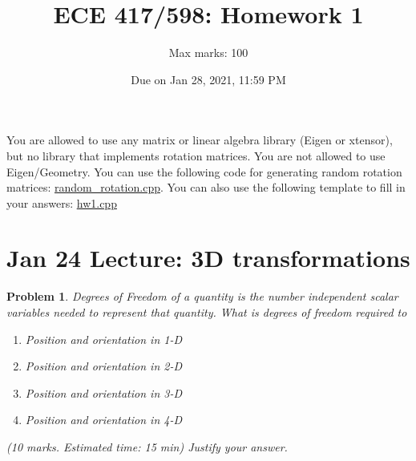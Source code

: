 \documentclass[twocolumn]{article}
\title{ECE 417/598: Homework 1}
\author{Max marks: 100}
\date{Due on Jan 28, 2021, 11:59 PM}
\newtheorem{prob}{Problem}
\newif\ifsol
\begin{document}
\maketitle

You are allowed to use any matrix or linear algebra library (Eigen or xtensor), but no
library that implements rotation matrices. You are not allowed to use
Eigen/Geometry. You can use the following code for generating random rotation matrices:
\href{https://github.com/wecacuee/ECE417-Mobile-Robots/blob/master/notebooks/random_rotation.cpp}{random\_rotation.cpp}.
You can also use the following template to fill in your answers: \href{https://vikasdhiman.info/ECE417-Mobile-Robots/hw/hw1/code/hw1.cpp}{hw1.cpp}

\section{Jan 24 Lecture: 3D transformations}
\begin{prob}
  Degrees of Freedom of a quantity is the number independent scalar variables
  needed to represent that quantity. What is degrees of freedom required to 
  \begin{enumerate}
    \item Position and orientation in 1-D
    \item Position and orientation in 2-D
    \item Position and orientation in 3-D
    \item Position and orientation in 4-D
  \end{enumerate} (10 marks. Estimated time: 15 min)
  Justify your answer.
\end{prob}

\ifsol
\paragraph*{Solution}
\begin{enumerate}
  \item 1D: position requires 1-DoF,  orientation requires a binary flag.
  \item 2D: position requires 2-DoF, orientation requires a single angle: 1-DoF.
  \item 3D: position requires 3-DoF, orientation requires 3-DoF because there
    are three pairs of axis X-Y, Y-Z, Z-X.
  \item 4D: position requires 4-DoF, orientation requires 6-DoF because there
    are 6 pairs of axis: $^4C_2 = 6$.
\end{enumerate}
\fi
\end{document}
